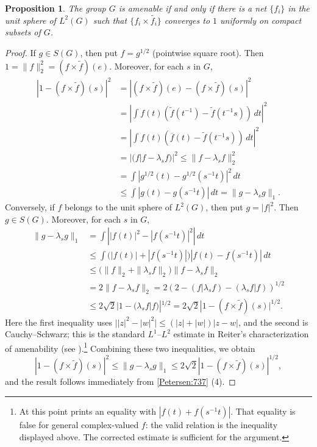 \documentclass{book}
\newtheorem{proposition}[definition]{Proposition}
\begin{document}
\begin{proposition}\label{Petersen:738}
  The group \(G\) is amenable if and only if there is a net \(\{f_i\}\) in the unit sphere of 
  \(L^2(G)\) such that \(\{f_i\times \tilde{f_i}\}\) converges to \(1\) uniformly on compact subsets of \(G\).
\end{proposition}
\begin{proof}
  If \(g\in S(G)\), then put \(f=g^{1/2}\) (pointwise square root). Then \(1=\|f\|^2_2=(f\times\tilde{f})(e)\). Moreover, for each \(s\) in \(G\),
  \begin{align*}
    |1-(f\times\tilde{f})(s)|^2&=|(f\times\tilde{f})(e)-(f\times\tilde{f})(s)|^2\\
    &=\left| \int f(t)(\tilde{f}(t^{-1})-\tilde{f}(t^{-1}s))\,dt\right|^2\\
    &=\left|\int f(t)(\overline{f}(t)-\tilde{f}(t^{-1}s))\,dt\right|^2\\
    &=|(f|f-\lambda_s f)|^2\leq\|f-\lambda_s f\|_2^2\\
    &=\int|g^{1/2}(t)-g^{1/2}(s^{-1}t)|^2\,dt\\
    &\leq\int|g(t)-g(s^{-1}t)|\,dt=\|g-\lambda_s g\|_1.
  \end{align*}
  Conversely, if \(f\) belongs to the unit sphere of \(L^2(G)\), then put \(g=|f|^2\). 
  Then \(g\in S(G)\). Moreover, for each \(s\) in \(G\),
  \begin{align*}
    \|g-\lambda_s g\|_1&=\int\left||f(t)|^2-|f(s^{-1}t)|^2\right|\,dt\\
    &\leq\int\bigl(|f(t)|+|f(s^{-1}t)|\bigr)|f(t)-f(s^{-1}t)|\,dt\\
    &\leq\bigl(\|f\|_2+\|\lambda_s f\|_2\bigr)\|f-\lambda_s f\|_2\\
    &=2\|f-\lambda_s f\|_2=2(2-(f|\lambda_s f)-(\lambda_s f|f))^{1/2}\\
    &\leq2\sqrt{2}|1-(\lambda_s f|f)|^{1/2}=2\sqrt{2}|1-(f\times \tilde{f})(s)|^{1/2}.
  \end{align*}
  Here the first inequality uses
  \(\bigl||z|^2-|w|^2\bigr|\leq(|z|+|w|)|z-w|\), and the second is Cauchy--Schwarz;
  this is the standard \(L^1\)--\(L^2\) estimate in Reiter's characterization of amenability
  (see \cite{Greenleaf1969}).\footnote{At this point \cite[Proposition~7.3.8]{PGK79} prints an equality
  with \(|f(t)+f(s^{-1}t)|\). That equality is false for general complex-valued \(f\): the valid relation is the
  inequality displayed above. The corrected estimate is sufficient for the argument.}
  Combining these two inequalities, we obtain
  \[
    |1-(f\times\tilde{f})(s)|^2\leq\|g-\lambda_s g\|_1\leq2\sqrt{2}|1-(f\times\tilde{f})(s)|^{1/2},
  \]
  and the result follows immediately from \ref{Petersen:737} (4).
\end{proof}
\end{document}
